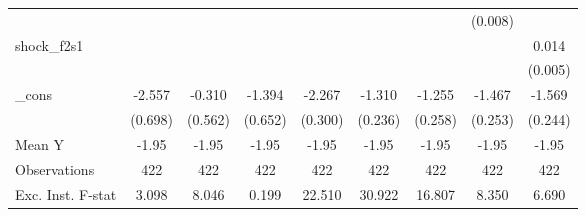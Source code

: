 {\begin{tabular}{l*{8}{c}}
            &                     &                     &                     &                     &                     &                     &     (0.008)         &                     \\
\addlinespace
shock\_f2s1  &                     &                     &                     &                     &                     &                     &                     &       0.014\sym{**} \\
            &                     &                     &                     &                     &                     &                     &                     &     (0.005)         \\
\addlinespace
\_cons      &      -2.557\sym{***}&      -0.310         &      -1.394\sym{**} &      -2.267\sym{***}&      -1.310\sym{***}&      -1.255\sym{***}&      -1.467\sym{***}&      -1.569\sym{***}\\
            &     (0.698)         &     (0.562)         &     (0.652)         &     (0.300)         &     (0.236)         &     (0.258)         &     (0.253)         &     (0.244)         \\
\midrule
Mean Y      &       -1.95         &       -1.95         &       -1.95         &       -1.95         &       -1.95         &       -1.95         &       -1.95         &       -1.95         \\
Observations&         422         &         422         &         422         &         422         &         422         &         422         &         422         &         422         \\
Exc. Inst. F-stat&       3.098         &       8.046         &       0.199         &      22.510         &      30.922         &      16.807         &       8.350         &       6.690         \\
\bottomrule
\end{tabular}
}
